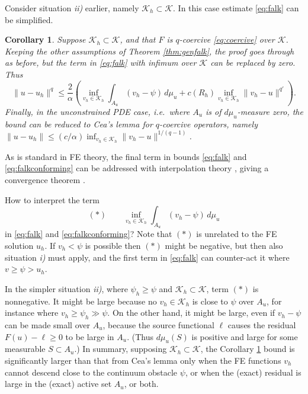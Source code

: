 \documentclass[]{interact}
\theoremstyle{plain}%
\newtheorem{corollary}[theorem]{Corollary}
\theoremstyle{definition}
\theoremstyle{remark}
\newcommand{\cK}{\mathcal{K}}
\begin{document}
Consider situation \emph{ii)} earlier, namely $\cK_h\subset \cK$.  In this case estimate \eqref{eq:falk} can be simplified.

\begin{corollary} \label{cor:falkconforming}
Suppose $\cK_h\subset \cK$, and that $F$ is $q$-coercive \eqref{eq:coercive} over $\cK$.  Keeping the other assumptions of Theorem \ref{thm:genfalk}, the proof goes through as before, but the term in \eqref{eq:falk} with infimum over $\cK$ can be replaced by zero.  Thus
\begin{equation} \label{eq:falkconforming}
\|u-u_h\|^q \le \frac{2}{\alpha} \left(\inf_{v_h\in\cK_h} \int_{A_u} (v_h-\psi)\,d\mu_u + c(R_h) \inf_{v_h\in\cK_h} \|v_h - u\|^{q'}\right).
\end{equation}
Finally, in the unconstrained PDE case, i.e.~where $A_u$ is of $d\mu_u$-measure zero, the bound can be reduced to Cea's lemma for $q$-coercive operators, namely $\|u-u_h\| \le (c/\alpha) \inf_{v_h\in\cK_h} \|v_h - u\|^{1/(q-1)}$.
\end{corollary}

As is standard in FE theory, the final term in bounds \eqref{eq:falk} and \eqref{eq:falkconforming} can be addressed with interpolation theory \cite{Ciarlet2002,ElmanSilvesterWathen2014}, giving a convergence theorem \cite[Theorem 5.1.2]{Ciarlet2002}.

How to interpret the term
	$$(\ast) \qquad \inf_{v_h\in\cK_h} \int_{A_u} (v_h-\psi)\,d\mu_u$$
in \eqref{eq:falk} and \eqref{eq:falkconforming}?  Note that $(\ast)$ is unrelated to the FE solution $u_h$.  If $v_h < \psi$ is possible then $(\ast)$ might be negative, but then also situation \emph{i)} must apply, and the first term in \eqref{eq:falk} can counter-act it where $v\ge \psi > u_h$.

In the simpler situation \emph{ii)}, where $\psi_h\ge \psi$ and $\cK_h\subset \cK$, term $(\ast)$ is nonnegative.  It might be large because no $v_h\in\cK_h$ is close to $\psi$ over $A_u$, for instance where $v_h\ge \psi_h \gg \psi$.  On the other hand, it might be large, even if $v_h-\psi$ can be made small over $A_u$, because the source functional $\ell$ causes the residual $F(u)-\ell\ge 0$ to be large in $A_u$.  (Thus $d\mu_u(S)$ is positive and large for some measurable $S\subset A_u$.)  In summary, supposing $\cK_h\subset \cK$, the Corollary \ref{cor:falkconforming} bound is significantly larger than that from Cea's lemma only when the FE functions $v_h$ cannot descend close to the continuum obstacle $\psi$, or when the (exact) residual is large in the (exact) active set $A_u$, or both.
\end{document}

